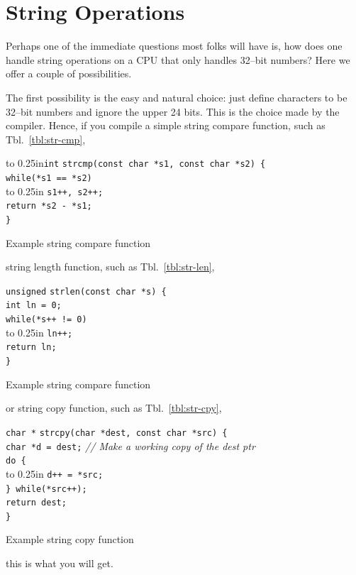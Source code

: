 \documentclass{gqtekspec}
\begin{document}
\section{String Operations}
Perhaps one of the immediate questions most folks will have is, how does one
handle string operations on a CPU that only handles 32--bit numbers?  Here we
offer a couple of possibilities.

The first possibility is the easy and natural choice: just define characters
to be 32--bit numbers and ignore the upper 24 bits.  This is the choice made
by the compiler.  Hence, if you compile a simple string compare function,
such as Tbl.~\ref{tbl:str-cmp},
\begin{table}\begin{center}
\begin{tabbing}
\hbox to 0.25in{\tt int} \= {\tt strcmp(const char *s1, const char *s2) \{} \\
	\> {\tt while(*s1 == *s2)} \\
	\> \hbox to 0.25in{} {\tt s1++, s2++;} \\
	\> {\tt return *s2 - *s1;} \\
{\tt \}}
\end{tabbing}
\caption{Example string compare function}\label{tbl:str-cmp}
\end{center}\end{table}
string length function, such as Tbl.~\ref{tbl:str-len},
\begin{table}\begin{center}
\begin{tabbing}
{\tt unsigned} \= {\tt strlen(const char *s) \{} \\
	\> {\tt int ln = 0;} \\
	\> {\tt while(*s++ != 0)} \\
	\> \hbox to 0.25in{} {\tt ln++;} \\
	\> {\tt return ln;} \\
{\tt \}}
\end{tabbing}
\caption{Example string compare function}\label{tbl:str-len}
\end{center}\end{table}
or string copy function, such as Tbl.~\ref{tbl:str-cpy},
\begin{table}\begin{center}
\begin{tabbing}
{\tt char *} \= {\tt strcpy(char *dest, const char *src) \{} \\
	\> {\tt char *d = dest;} {\em // Make a working copy of the dest ptr}\\
	\> {\tt do \{} \\
	\> \hbox to 0.25in{} {\tt *d++ = *src;} \\
	\> {\tt \} while(*src++);} \\
	\> {\tt return dest;} \\
{\tt \}}
\end{tabbing}
\caption{Example string copy function}\label{tbl:str-cpy}
\end{center}\end{table}
this is what you will get.
\end{document}
